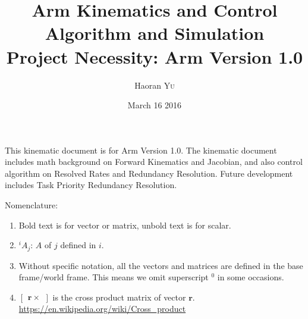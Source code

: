 \documentclass{article}
\title{Arm Kinematics and Control \\ Algorithm and Simulation \\ Project Necessity: Arm Version 1.0} %
\author{Haoran \textsc{Yu}} %
\date{March 16 2016} %
\begin{document}
\maketitle

This kinematic document is for Arm Version 1.0. The kinematic document includes math background on Forward Kinematics and Jacobian, and also control algorithm on Resolved Rates and Redundancy Resolution. Future development includes Task Priority Redundancy Resolution.

Nomenclature:
\begin{enumerate}
\item Bold text is for vector or matrix, unbold text is for scalar.
\item $^{i}A_{j}$: $A$ of $j$ defined in $i$.
\item Without specific notation, all the vectors and matrices are defined in the base frame/world frame. This means we omit superscript $^0$ in some occasions. 
\item $\begin{bmatrix}\mathbf{r}\times\end{bmatrix}$ is the cross product matrix of vector $\mathbf{r}$. \url{https://en.wikipedia.org/wiki/Cross_product}
\end{enumerate}

\end{document}
